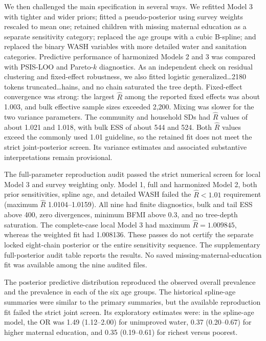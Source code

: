 \documentclass[11pt]{article}
\begin{document}
We then challenged the main specification in several ways. We refitted Model 3 with tighter and wider priors; fitted a pseudo-posterior using survey weights rescaled to mean one; retained children with missing maternal education as a separate sensitivity category; replaced the age groups with a cubic B-spline; and replaced the binary WASH variables with more detailed water and sanitation categories. Predictive performance of harmonized Models 2 and 3 was compared with PSIS-LOO and Pareto-$k$ diagnostics. As an independent check on residual clustering and fixed-effect robustness, we also fitted logistic generalized…2180 tokens truncated…hains, and no chain saturated the tree depth. Fixed-effect convergence was strong: the largest $\hat R$ among the reported fixed effects was about 1.003, and bulk effective sample sizes exceeded 2,200. Mixing was slower for the two variance parameters. The community and household SDs had $\hat R$ values of about 1.021 and 1.018, with bulk ESS of about 544 and 524. Both $\hat R$ values exceed the commonly used 1.01 guideline, so the retained fit does not meet the strict joint-posterior screen. Its variance estimates and associated substantive interpretations remain provisional.

The full-parameter reproduction audit passed the strict numerical screen for local Model 3 and survey weighting only. Model 1, full and harmonized Model 2, both prior sensitivities, spline age, and detailed WASH failed the $\hat R<1.01$ requirement (maximum $\hat R$ 1.0104--1.0159). All nine had finite diagnostics, bulk and tail ESS above 400, zero divergences, minimum BFMI above 0.3, and no tree-depth saturation. The complete-case local Model 3 had maximum $\hat R=1.009845$, whereas the weighted fit had 1.008136. These passes do not certify the separate locked eight-chain posterior or the entire sensitivity sequence. The supplementary full-posterior audit table reports the results. No saved missing-maternal-education fit was available among the nine audited files.

The posterior predictive distribution reproduced the observed overall prevalence and the prevalence in each of the six age groups. The historical spline-age summaries were similar to the primary summaries, but the available reproduction fit failed the strict joint screen. Its exploratory estimates were: in the spline-age model, the OR was 1.49 (1.12--2.00) for unimproved water, 0.37 (0.20--0.67) for higher maternal education, and 0.35 (0.19--0.61) for richest versus poorest.
\end{document}
